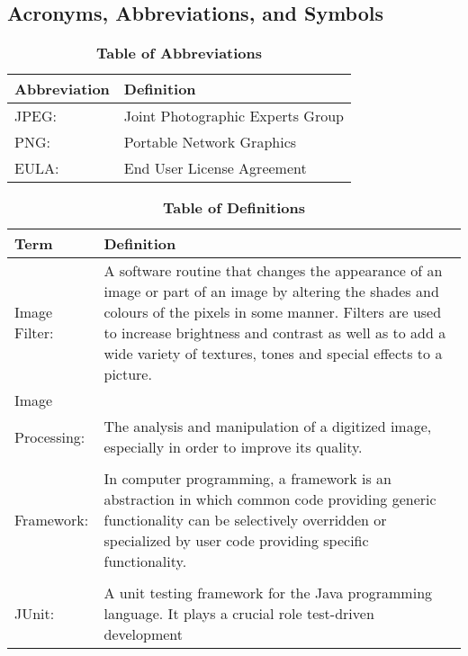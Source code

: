 \documentclass[12pt, titlepage]{article}
\begin{document}
\subsection{Acronyms, Abbreviations, and Symbols}
	
\begin{table}[hbp]
\caption{\textbf{Table of Abbreviations}} \label{Table}

\begin{tabularx}{\textwidth}{p{3cm}X}
\toprule
\textbf{Abbreviation} & \textbf{Definition} \\
\midrule
JPEG: & Joint Photographic Experts Group\\
PNG:  & Portable Network Graphics\\
EULA: & End User License Agreement\\
\bottomrule
\end{tabularx}

\end{table}

\begin{table}[!htbp]
\caption{\textbf{Table of Definitions}} \label{Table}

\begin{tabularx}{\textwidth}{p{3cm}X}
\toprule
\textbf{Term} & \textbf{Definition}\\
\midrule

Image Filter: & A software routine that changes the appearance of an image or part of an image by altering the shades and colours of the pixels in some manner. Filters are used to increase brightness and contrast as well as to add a wide variety of textures, tones and special effects to a picture.\\ 
Image \\ Processing: & The analysis and manipulation of a digitized image, especially in order to improve its quality. \\
\\Framework: & In computer programming, a framework is an abstraction in which common code providing generic functionality can be selectively overridden or specialized by user code providing specific functionality.\\
\\JUnit: & A unit testing framework for the Java programming language. It plays a crucial role test-driven development\\


\bottomrule
\end{tabularx}

\end{table}	
\end{document}
